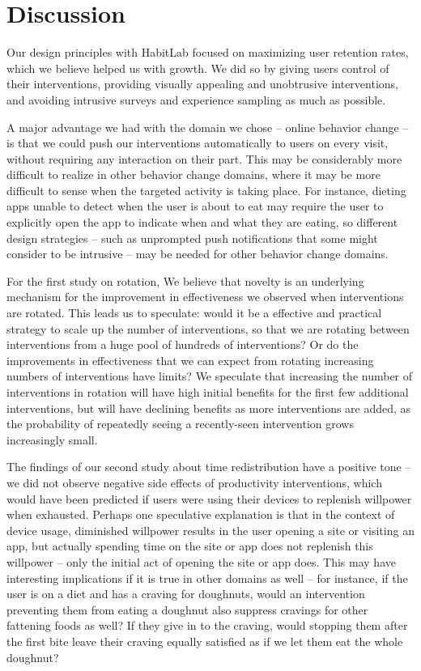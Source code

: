 \chapter{Discussion}

Our design principles with HabitLab focused on maximizing user retention rates, which we believe helped us with growth. We did so by giving users control of their interventions, providing visually appealing and unobtrusive interventions, and avoiding intrusive surveys and experience sampling as much as possible.

A major advantage we had with the domain we chose -- online behavior change -- is that we could push our interventions automatically to users on every visit, without requiring any interaction on their part. This may be considerably more difficult to realize in other behavior change domains, where it may be more difficult to sense when the targeted activity is taking place. For instance, dieting apps unable to detect when the user is about to eat may require the user to explicitly open the app to indicate when and what they are eating, so different design strategies -- such as unprompted push notifications that some might consider to be intrusive -- may be needed for other behavior change domains.

For the first study on rotation, We believe that novelty is an underlying mechanism for the improvement in effectiveness we observed when interventions are rotated. This leads us to speculate: would it be a effective and practical strategy to scale up the number of interventions, so that we are rotating between interventions from a huge pool of hundreds of interventions? Or do the improvements in effectiveness that we can expect from rotating increasing numbers of interventions have limits? We speculate that increasing the number of interventions in rotation will have high initial benefits for the first few additional interventions, but will have declining benefits as more interventions are added, as the probability of repeatedly seeing a recently-seen intervention grows increasingly small.

The findings of our second study about time redistribution have a positive tone -- we did not observe negative side effects of productivity interventions, which would have been predicted if users were using their devices to replenish willpower when exhausted. Perhaps one speculative explanation is that in the context of device usage, diminished willpower results in the user opening a site or visiting an app, but actually spending time on the site or app does not replenish this willpower -- only the initial act of opening the site or app does. This may have interesting implications if it is true in other domains as well -- for instance, if the user is on a diet and has a craving for doughnuts, would an intervention preventing them from eating a doughnut also suppress cravings for other fattening foods as well? If they give in to the craving, would stopping them after the first bite leave their craving equally satisfied as if we let them eat the whole doughnut?

